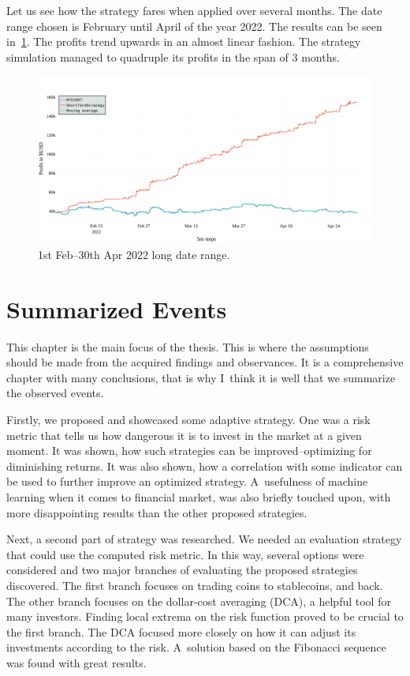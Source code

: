 Let us see how the strategy fares when applied over several months. The date range chosen is February until April of the year 2022. The results can be seen in~\ref{figure-short-term-long}. The profits trend upwards in an almost linear fashion. The strategy simulation managed to quadruple its profits in the span of 3 months.

\begin{figure}[!hbt]
    \centering
    \includegraphics[width=\columnwidth]{figures/short-term-long.pdf}
    \caption{1st Feb--30th Apr 2022 long date range.}
    \label{figure-short-term-long}
\end{figure}

\section{Summarized Events}
\label{section-summarized-events}
This chapter is the main focus of the thesis. This is where the assumptions should be made from the acquired findings and observances. It is a comprehensive chapter with many conclusions, that is why I~think it is well that we summarize the observed events.

Firstly, we proposed and showcased some adaptive strategy. One was a risk metric that tells us how dangerous it is to invest in the market at a given moment. It was shown, how such strategies can be improved--optimizing for diminishing returns. It was also shown, how a correlation with some indicator can be used to further improve an optimized strategy. A~usefulness of machine learning when it comes to financial market, was also briefly touched upon, with more disappointing results than the other proposed strategies.

Next, a second part of strategy was researched. We needed an evaluation strategy that could use the computed risk metric. In this way, several options were considered and two major branches of evaluating the proposed strategies discovered. The first branch focuses on trading coins to stablecoins, and back. The other branch focuses on the dollar-cost averaging (DCA), a helpful tool for many investors. Finding local extrema on the risk function proved to be crucial to the first branch. The DCA focused more closely on how it can adjust its investments according to the risk. A~solution based on the Fibonacci sequence was found with great results.

